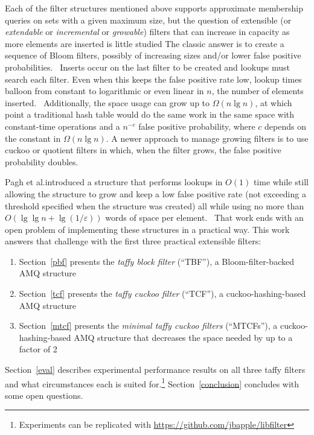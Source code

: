 \documentclass[sigconf, nonacm]{acmart}
\newcommand{\etal}{et al.}
\begin{document}
Each of the filter structures mentioned above supports approximate membership queries on sets with a given maximum size, but the question of extensible (or {\itshape extendable} or {\itshape incremental} or {\itshape growable}) filters that can increase in capacity as more elements are inserted is little studied
The classic answer is to create a sequence of Bloom filters, possibly of increasing sizes and/or lower false positive probabilities.~\cite{dynamic-bloom,scalable-bloom}
Inserts occur on the last filter to be created and lookups must search each filter.
Even when this keeps the false positive rate low, lookup times balloon from constant to logarithmic or even linear in $n$, the number of elements inserted.~\cite{psw,logarithm,consistent-cuckoo} %
Additionally, the space usage can grow up to $\Omega(n \lg n)$, at which point a traditional hash table would do the same work in the same space with constant-time operations and a $n^{-c}$ false positive probability, where $c$ depends on the constant in $\Omega(n \lg n)$.
A newer approach to manage growing filters is to use cuckoo or quotient filters in which, when the filter grows, the false positive probability doubles.~\cite{logarithm,morton-journal,vacuum,rsqf}

Pagh \etal introduced a structure that performs lookups in $O(1)$ time while still allowing the structure to grow and keep a low false positive rate (not exceeding a threshold specified when the structure was created) all while using no more than $O(\lg \lg n + \lg (1/\varepsilon))$ words of space per element.~\cite{psw}
That work ends with an open problem of implementing these structures in a practical way.
This work answers that challenge with the first three practical extensible filters:

\begin{enumerate}
\item Section~\ref{pbf}  presents the {\em taffy block filter}           (``TBF''),   a Bloom-filter-backed AMQ structure
\item Section~\ref{tcf}  presents the {\em taffy cuckoo filter}          (``TCF''),   a cuckoo-hashing-based AMQ structure
\item Section~\ref{mtcf} presents the {\em minimal taffy cuckoo filters} (``MTCFs''), a cuckoo-hashing-based AMQ structure that decreases the space needed by up to a factor of 2
\end{enumerate}

Section~\ref{eval} describes experimental performance results on all three taffy filters and what circumstances each is suited for.\footnote{Experiments can be replicated with \url{https://github.com/jbapple/libfilter}}
Section~\ref{conclusion} concludes with some open questions.
\end{document}
